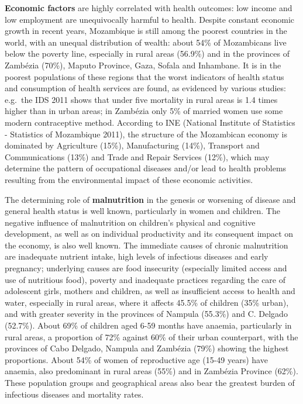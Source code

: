 \documentclass[
]{book}
\begin{document}
\textbf{Economic factors} are highly correlated with health outcomes: low income and low employment are unequivocally harmful to health. Despite constant economic growth in recent years, Mozambique is still among the poorest countries in the world, with an unequal distribution of wealth: about 54\% of Mozambicans live below the poverty line, especially in rural areas (56.9\%) and in the provinces of Zambézia (70\%), Maputo Province, Gaza, Sofala and Inhambane. It is in the poorest populations of these regions that the worst indicators of health status and consumption of health services are found, as evidenced by various studies: e.g.~the IDS 2011 shows that under five mortality in rural areas is 1.4 times higher than in urban areas; in Zambézia only 5\% of married women use some modern contraceptive method. According to INE (National Institute of Statistics - Statistics of Mozambique 2011), the structure of the Mozambican economy is dominated by Agriculture (15\%), Manufacturing (14\%), Transport and Communications (13\%) and Trade and Repair Services (12\%), which may determine the pattern of occupational diseases and/or lead to health problems resulting from the environmental impact of these economic activities.

The determining role of \textbf{malnutrition} in the genesis or worsening of disease and general health status is well known, particularly in women and children. The negative influence of malnutrition on children's physical and cognitive development, as well as on individual productivity and its consequent impact on the economy, is also well known. The immediate causes of chronic malnutrition are inadequate nutrient intake, high levels of infectious diseases and early pregnancy; underlying causes are food insecurity (especially limited access and use of nutritious food), poverty and inadequate practices regarding the care of adolescent girls, mothers and children, as well as insufficient access to health and water, especially in rural areas, where it affects 45.5\% of children (35\% urban), and with greater severity in the provinces of Nampula (55.3\%) and C. Delgado (52.7\%). About 69\% of children aged 6-59 months have anaemia, particularly in rural areas, a proportion of 72\% against 60\% of their urban counterpart, with the provinces of Cabo Delgado, Nampula and Zambézia (79\%) showing the highest proportions. About 54\% of women of reproductive age (15-49 years) have anaemia, also predominant in rural areas (55\%) and in Zambézia Province (62\%). These population groups and geographical areas also bear the greatest burden of infectious diseases and mortality rates.
\end{document}

